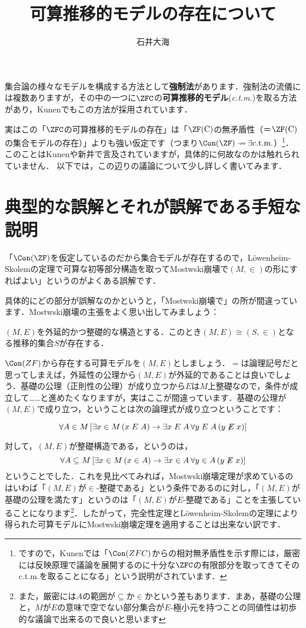 \documentclass[a4j]{ltjsarticle}
\title{可算推移的モデルの存在について}
\author{石井大海}
\begin{document}
\maketitle

集合論の様々なモデルを構成する方法として\textbf{強制法}があります．強制法の流儀には複数ありますが，その中の一つに$\ZFC$の\textbf{可算推移的モデル}(\textit{c.t.m.})を取る方法があり，Kunen\cite{Kunen:2011}でもこの方法が採用されています．

実はこの「$\ZFC$の可算推移的モデルの存在」は「$\ZF(\mathrm{C})$の無矛盾性（＝$\ZF(\mathrm{C})$の集合モデルの存在）」よりも強い仮定です（つまり$\Con(\ZF) \nrightarrow \exists \text{c.t.m.}$）\footnote{ですので，Kunenでは「$\Con(ZFC)$からの相対無矛盾性を示す際には，厳密には反映原理で議論を展開するのに十分な$\ZFC$の有限部分を取ってきてそのc.t.m.を取ることになる」という説明がされています．}．このことはKunen\cite{Kunen:2011}や新井\cite{Arai:2011}で言及されていますが，具体的に何故なのかは触れられていません．
以下では，この辺りの議論について少し詳しく書いてみます．

\section{典型的な誤解とそれが誤解である手短な説明}
「$\Con(\ZF)$を仮定しているのだから集合モデルが存在するので，L\"{o}wenheim-Skolemの定理で可算な初等部分構造を取ってMostwski崩壊で$(M, \in)$の形にすればよい」というのがよくある誤解です．

具体的にどの部分が誤解なのかというと，「Mostwski崩壊で」の所が間違っています．Mostwski崩壊の主張をよく思い出してみましょう：

\begin{theorem}[Mostwski]
 $(M, E)$を外延的かつ整礎的な構造とする．このとき$(M, E) \cong (S, \in)$となる推移的集合$S$が存在する．
\end{theorem}

$\Con(ZF)$から存在する可算モデルを$(M, E)$としましょう．$=$は論理記号だと思ってしまえば，外延性の公理から$(M, E)$が外延的であることは良いでしょう．基礎の公理（正則性の公理）が成り立つから$E$は$M$上整礎なので，条件が成立して……と進めたくなりますが，実はここが間違っています．基礎の公理が$(M, E)$で成り立つ，ということは次の論理式が成り立つということです：

\[
 \forall A \in M\, [\exists x \in M\,(x \mathrel{E} A) \rightarrow \exists x \mathrel{E} A \, \forall y \mathrel{E} A\, (y \not\mathrel{E} x)]
\]

対して，$(M, E)$が整礎構造である，というのは，
\[
 \forall A \subseteq M\, [\exists x \in M\,(x \in A) \rightarrow \exists x \in A \, \forall y \in A\, (y \not\mathrel{E} x)]
\]
ということでした．これを見比べてみれば，Mostwski崩壊定理が求めているのはいわば「$(M, E)$が$\in$-整礎である」という条件であるのに対し，「$(M, E)$が基礎の公理を満たす」というのは「$(M, E)$が$E$-整礎である」ことを主張していることになります\footnote{また，厳密には$A$の範囲が$\subseteq$か$\in$かという差もあります．まあ，基礎の公理と，$M$が$E$の意味で空でない部分集合が$E$-極小元を持つことの同値性は初歩的な議論で出来るので良いと思います}．したがって，完全性定理とL\"{o}wenheim-Skolemの定理により得られた可算モデルにMostwski崩壊定理を適用することは出来ない訳です．
\end{document}
